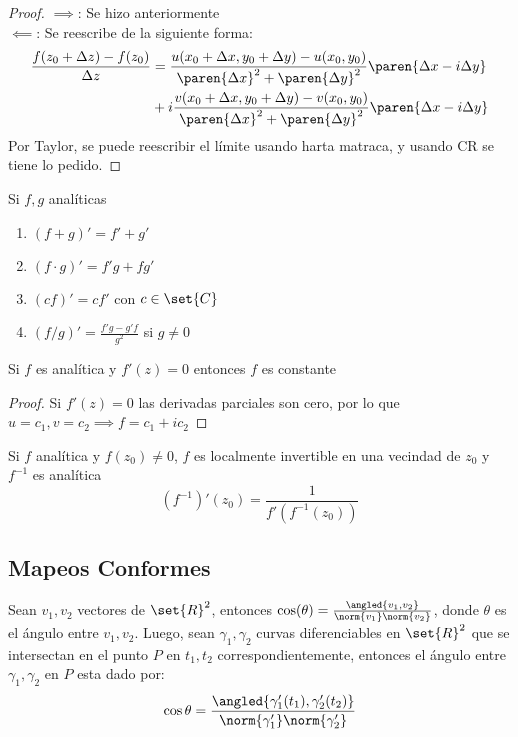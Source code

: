 \documentclass{notetaking}
\begin{document}
\begin{proof}
    \(\implies\): Se hizo anteriormente\\
    \(\impliedby\): Se reescribe de la siguiente forma:
    \begin{align*}
        \frac{f(z_0+\Delta z)-f(z_0)}{\Delta z} &=\frac{u(x_0+\Delta x,y_0+\Delta y)-u(x_0,y_0)}{\paren{\Delta x}^2+\paren{\Delta y}^2}\paren{\Delta x-i\Delta y}\\&+i\frac{v(x_0+\Delta x,y_0+\Delta y)-v(x_0,y_0)}{\paren{\Delta x}^2+\paren{\Delta y}^2}\paren{\Delta x-i\Delta y}
    \end{align*}
    Por Taylor, se puede reescribir el límite usando harta matraca, y usando CR se tiene lo pedido.
\end{proof}

\begin{thm}
    Si \(f,g\) analíticas
    \begin{enumerate}
        \item \((f+g)'=f'+g'\)
        \item \((f\cdot g)'=f'g+fg'\)
        \item \((cf)'=cf'\) con \(c\in\set{C}\)
        \item \((f/g)'=\frac{f'g-g'f}{g^2}\) si \(g\neq0\)
    \end{enumerate}
\end{thm}
\begin{thm}
    Si \(f\) es analítica y \(f'(z)=0\) entonces \(f\) es constante
\end{thm}

\begin{proof}
    Si \(f'(z)=0\) las derivadas parciales son cero, por lo que \(u=c_1,v=c_2\implies f=c_1+ic_2\)
\end{proof}

\begin{thm}
    Si \(f\) analítica y \(f(z_0)\neq 0\), \(f\) es localmente invertible en una vecindad de \(z_0\) y \(f^{-1}\) es analítica
    \[
        (f^{-1})'(z_0)=\frac1{f'(f^{-1}(z_0))}
    \]
\end{thm}

\subsection{Mapeos Conformes}
\begin{defn}
    Sean \(v_1,v_2\) vectores de \(\set{R}^2\), entonces \(\cos(\theta)=\frac{\angled{v_1,v_2}}{\norm{v_1}\norm{v_2}}\), donde \(\theta\) es el ángulo entre \(v_1,v_2\). Luego, sean \(\gamma_1,\gamma_2\) curvas diferenciables en \(\set{R}^2\) que se intersectan en el punto \(P\) en \(t_1,t_2\) correspondientemente, entonces el ángulo entre \(\gamma_1,\gamma_2\) en \(P\) esta dado por:
    \[
        \cos\theta=\frac{\angled{\gamma_1'(t_1),\gamma_2'(t_2)}}{\norm{\gamma_1'}\norm{\gamma_2'}}
    \]
\end{defn}
\end{document}
